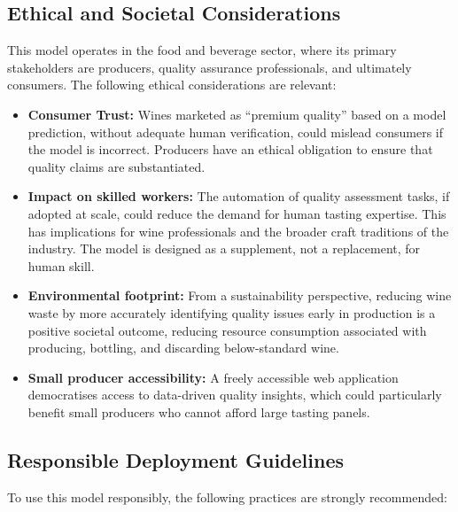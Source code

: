 \documentclass[11pt,a4paper]{article}
\begin{document}
\subsection{Ethical and Societal Considerations}

This model operates in the food and beverage sector, where its primary stakeholders are producers, quality assurance professionals, and ultimately consumers. The following ethical considerations are relevant:

\begin{itemize}[leftmargin=*]
    \item \textbf{Consumer Trust:} Wines marketed as ``premium quality'' based on a model prediction, without adequate human verification, could mislead consumers if the model is incorrect. Producers have an ethical obligation to ensure that quality claims are substantiated.

    \item \textbf{Impact on skilled workers:} The automation of quality assessment tasks, if adopted at scale, could reduce the demand for human tasting expertise. This has implications for wine professionals and the broader craft traditions of the industry. The model is designed as a supplement, not a replacement, for human skill.

    \item \textbf{Environmental footprint:} From a sustainability perspective, reducing wine waste by more accurately identifying quality issues early in production is a positive societal outcome, reducing resource consumption associated with producing, bottling, and discarding below-standard wine.

    \item \textbf{Small producer accessibility:} A freely accessible web application democratises access to data-driven quality insights, which could particularly benefit small producers who cannot afford large tasting panels.
\end{itemize}

\subsection{Responsible Deployment Guidelines}

To use this model responsibly, the following practices are strongly recommended:
\end{document}
